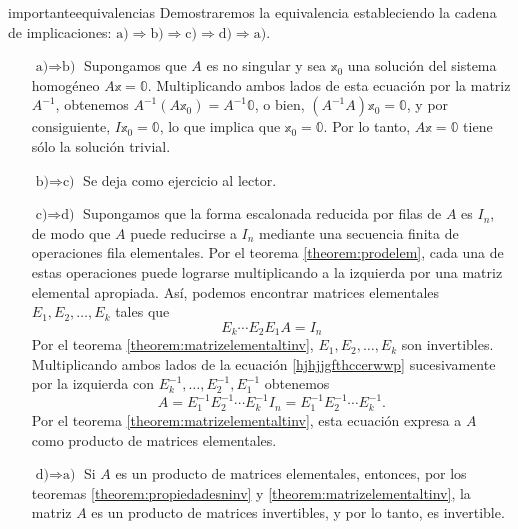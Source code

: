 \begin{theorem}{}{importanteequivalencias}
    \tcblower
    \demostracion Demostraremos la equivalencia estableciendo la cadena de implicaciones: $\text{a)} \Rightarrow \text{b)} \Rightarrow \text{c)} \Rightarrow \text{d)} \Rightarrow \text{a)}$.
    \begin{enumerate}[leftmargin=1.74cm, topsep=6pt, itemsep=0pt]
        \item[$\text{a)} \Rightarrow \text{b)}$] Supongamos que $A$ es no singular y sea $\mathbb{x}_0$ una solución del sistema homogéneo $A\mathbb{x} = \mathbb{0}$. Multiplicando ambos lados de esta ecuación por la matriz $A^{-1}$, obtenemos $A^{-1}(A\mathbb{x}_0) = A^{-1}\mathbb{0}$, o bien, $\left(A^{-1}A\right)\mathbb{x}_0 = \mathbb{0}$, y por consiguiente, $I\mathbb{x}_0 = \mathbb{0}$, lo que implica que $\mathbb{x}_0 = \mathbb{0}$. Por lo tanto, $A\mathbb{x} = \mathbb{0}$ tiene sólo la solución trivial.
        \item[$\text{b)} \Rightarrow \text{c)}$] Se deja como ejercicio al lector.
        \item[$\text{c)} \Rightarrow \text{d)}$] Supongamos que la forma escalonada reducida por filas de $A$ es $I_n$, de modo que $A$ puede reducirse a $I_n$ mediante una secuencia finita de operaciones fila elementales. Por el teorema \ref{theorem:prodelem}, cada una de estas operaciones puede lograrse multiplicando a la izquierda por una matriz elemental apropiada. Así, podemos encontrar matrices elementales $E_1, E_2, \ldots, E_k$ tales que
        \begin{equation}
            E_k \cdots E_2 E_1 A = I_n \label{hjhjjgfthccerwwp}
        \end{equation}
        \newpage
        Por el teorema \ref{theorem:matrizelementaltinv}, $E_1, E_2, \ldots, E_k$ son invertibles. Multiplicando ambos lados de la ecuación \eqref{hjhjjgfthccerwwp} sucesivamente por la izquierda con $E_k^{-1}, \ldots, E_2^{-1}, E_1^{-1}$ obtenemos
        $$A = E_1^{-1} E_2^{-1} \cdots E_k^{-1} I_n = E_1^{-1} E_2^{-1} \cdots E_k^{-1}.$$
        Por el teorema \ref{theorem:matrizelementaltinv}, esta ecuación expresa a $A$ como producto de matrices elementales.
        \item[$\text{d)} \Rightarrow \text{a)}$] Si $A$ es un producto de matrices elementales, entonces, por los teoremas \ref{theorem:propiedadesninv} y \ref{theorem:matrizelementaltinv}, la matriz $A$ es un producto de matrices invertibles, y por lo tanto, es invertible.
    \end{enumerate}
\end{theorem}

